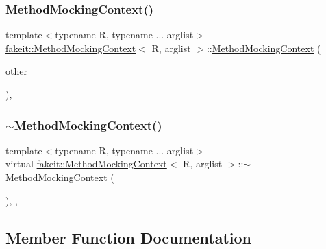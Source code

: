 \subsubsection{\texorpdfstring{MethodMockingContext()}{MethodMockingContext()}\hspace{0.1cm}{\footnotesize\ttfamily [27/27]}}
{\footnotesize\ttfamily template$<$typename R, typename ... arglist$>$ \\
\mbox{\hyperlink{classfakeit_1_1MethodMockingContext}{fakeit\+::\+Method\+Mocking\+Context}}$<$ R, arglist $>$\+::\mbox{\hyperlink{classfakeit_1_1MethodMockingContext}{Method\+Mocking\+Context}} (\begin{DoxyParamCaption}\item[{\mbox{\hyperlink{classfakeit_1_1MethodMockingContext}{Method\+Mocking\+Context}}$<$ R, arglist $>$ \&\&}]{other }\end{DoxyParamCaption})\hspace{0.3cm}{\ttfamily [inline]}, {\ttfamily [protected]}}

\mbox{\label{classfakeit_1_1MethodMockingContext_a92068a8b1affe1c7be6eafc12297c8c2}} 
\subsubsection{\texorpdfstring{$\sim$MethodMockingContext()}{~MethodMockingContext()}\hspace{0.1cm}{\footnotesize\ttfamily [9/9]}}
{\footnotesize\ttfamily template$<$typename R, typename ... arglist$>$ \\
virtual \mbox{\hyperlink{classfakeit_1_1MethodMockingContext}{fakeit\+::\+Method\+Mocking\+Context}}$<$ R, arglist $>$\+::$\sim$\mbox{\hyperlink{classfakeit_1_1MethodMockingContext}{Method\+Mocking\+Context}} (\begin{DoxyParamCaption}{ }\end{DoxyParamCaption})\hspace{0.3cm}{\ttfamily [inline]}, {\ttfamily [protected]}, {\ttfamily [virtual]}}



\subsection{Member Function Documentation}
\mbox{\label{classfakeit_1_1MethodMockingContext_ad413d04564c89fe134dfb7bae1a1f2a1}} 
